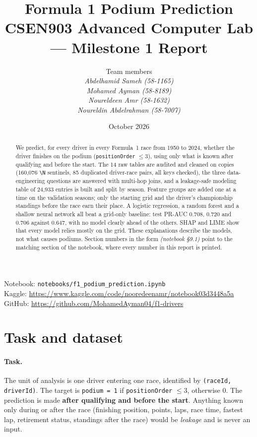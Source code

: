 \documentclass[11pt,a4paper]{article}
\title{\textbf{Formula 1 Podium Prediction}\\[4pt]
\large CSEN903 Advanced Computer Lab --- Milestone 1 Report}
\author{Team members\\[4pt]
  \textit{Abdelhamid Sameh (58-1165)} \\ \textit{Mohamed Ayman (58-8189)} \\
  \textit{Noureldeen Amr (58-1632)} \\ \textit{Noureldin Abdelrahman (58-7007)}}
\date{October 2026}
\newcommand{\code}[1]{\texttt{#1}}
\newcommand{\nb}[1]{\textit{(notebook \S#1)}}
\begin{document}
\maketitle

\begin{center}
\small
Notebook: \code{notebooks/f1\_podium\_prediction.ipynb}\\
Kaggle: \url{https://www.kaggle.com/code/nooredeenamr/notebook03d3448a5a}\\
GitHub: \url{https://github.com/MohamedAyman04/f1-drivers}
\end{center}

\begin{abstract}
\noindent
We predict, for every driver in every Formula~1 race from 1950 to 2024, whether the driver finishes on the podium (\code{positionOrder} $\le 3$), using only what is known after qualifying and before the start.
The 14 raw tables are audited and cleaned on copies (160{,}076 \verb|\N| sentinels, 85 duplicated driver-race pairs, all keys checked), the three data-engineering questions are answered with multi-hop joins, and a leakage-safe modeling table of 24{,}933 entries is built and split by season.
Feature groups are added one at a time on the validation seasons; only the starting grid and the driver's championship standings before the race earn their place.
A logistic regression, a random forest and a shallow neural network all beat a grid-only baseline: test PR-AUC 0.708, 0.720 and 0.706 against 0.647, with no model clearly ahead of the others.
SHAP and LIME show that every model relies mostly on the grid. These explanations describe the models, not what causes podiums.
Section numbers in the form \nb{9.1} point to the matching section of the notebook, where every number in this report is printed.
\end{abstract}

\tableofcontents
\newpage

\section{Task and dataset}

\paragraph{Task.} The unit of analysis is one driver entering one race, identified by \code{(raceId, driverId)}. The target is \code{podium = 1} if \code{positionOrder} $\le 3$, otherwise 0.
The prediction is made \textbf{after qualifying and before the start}. Anything known only during or after the race (finishing position, points, laps, race time, fastest lap, retirement status, standings after the race) would be \emph{leakage} and is never an input.
\end{document}
